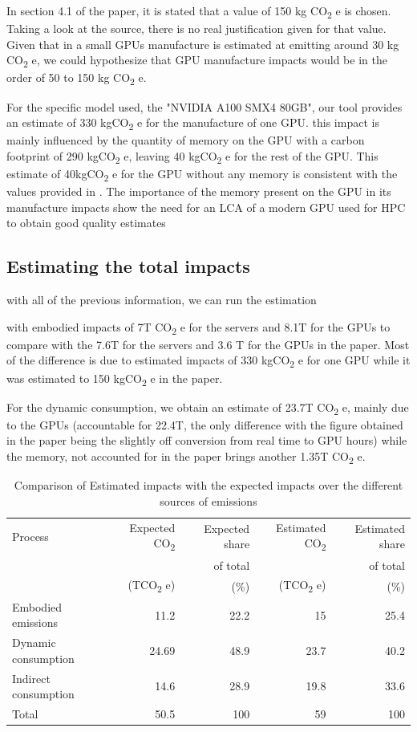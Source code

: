 \documentclass[11pt]{article}
\begin{document}
In section 4.1 of the paper, it is stated that a value of 150 kg CO\textsubscript{2} e is
chosen. Taking a look at the source, there is no real justification
given for that value. Given that in \cite{Loubet2023life} a small GPUs
manufacture is estimated at emitting around 30 kg CO\textsubscript{2} e, we could
hypothesize that GPU manufacture impacts would be in the order of 50
to 150 kg CO\textsubscript{2} e.

For the specific model used, the "NVIDIA A100 SMX4 80GB", our tool
provides an estimate of 330 kgCO\textsubscript{2} e for the manufacture of one GPU. this impact is mainly influenced
by the quantity of memory on the GPU with a carbon footprint of 290
kgCO\textsubscript{2} e, leaving 40 kgCO\textsubscript{2} e for the rest of the GPU.
This estimate of 40kgCO\textsubscript{2} e for the GPU without any memory is
consistent with the values provided in \cite{Loubet2023life}. The
importance of the memory present on the GPU in its manufacture impacts
show the need for an \gls{LCA} of a modern GPU used for \gls{HPC} to
obtain good quality estimates


\subsection{Estimating the total impacts}
\label{sec:org32645dd}

with all of the previous information, we can run the estimation

with embodied impacts of 7T CO\textsubscript{2} e for the servers and 8.1T for the
GPUs to compare with the 7.6T for the servers and 3.6 T for the GPUs
in the paper. Most of the difference is due to estimated impacts of
330 kgCO\textsubscript{2} e for one GPU while it was estimated to 150 kgCO\textsubscript{2} e in the
paper.

For the dynamic consumption, we obtain an estimate of 23.7T CO\textsubscript{2} e,
mainly due to the GPUs (accountable for 22.4T, the only difference with
the figure obtained in the paper being the slightly off conversion
from real time to GPU hours) while the memory, not accounted for in
the paper brings another 1.35T CO\textsubscript{2} e.


\begin{table}[htbp]
\caption{Comparison of Estimated impacts with the expected impacts over the different sources of emissions}
\centering
\begin{tabular}{lrrrr}
Process & Expected CO\textsubscript{2} & Expected share & Estimated CO\textsubscript{2} & Estimated share\\
 &  & of total &  & of total\\
 & (TCO\textsubscript{2} e) & (\%) & (TCO\textsubscript{2} e) & (\%)\\
\hline
Embodied emissions & 11.2 & 22.2 & 15 & 25.4\\
Dynamic consumption & 24.69 & 48.9 & 23.7 & 40.2\\
Indirect consumption & 14.6 & 28.9 & 19.8 & 33.6\\
\hline
Total & 50.5 & 100 & 59 & 100\\
\end{tabular}
\end{table}
\end{document}

